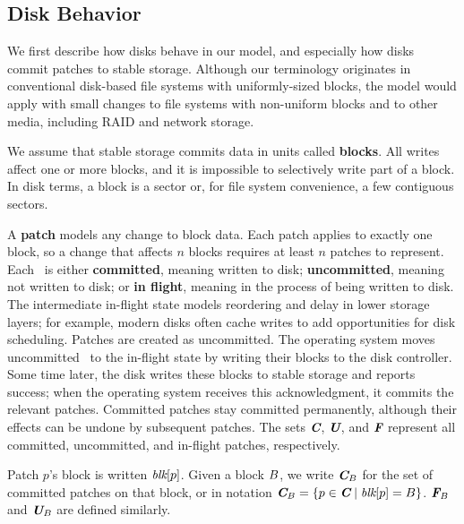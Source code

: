 \subsection{Disk Behavior}

We first describe how disks behave in our model, and
 especially how disks commit patches to stable storage.
%
Although our terminology originates in conventional disk-based file systems
 with uniformly-sized blocks, the model would apply with small changes to
 file systems with non-uniform blocks and to other media, including RAID
 and network storage.

We assume that stable storage commits data in units called
 \textbf{blocks}.
%
All writes affect one or more blocks, and it is impossible to selectively
 write part of a block.
%
In disk terms, a block is a sector or, for file system convenience,
 a few contiguous sectors.

A \textbf{patch} models any change to block data.
%
Each patch applies to exactly one block, so a change that
 affects $n$ blocks requires at least $n$ patches to represent.
%
Each \patch\ is either
 \textbf{committed}, meaning written to disk;
 \textbf{uncommitted}, meaning not written to disk;
 or \textbf{in flight}, meaning in the process of being written to disk.
%
The intermediate in-flight state models reordering and delay in
 lower storage layers; for example, modern disks often cache
 writes to add opportunities for disk scheduling.
%
Patches are created as uncommitted.
%
The operating system moves uncommitted \patches\ to the in-flight state
 by writing their blocks to the disk controller.  Some
 time later, the disk writes these blocks
 to stable storage and reports success; when the operating system receives this
 acknowledgment, it commits the relevant patches.
%
Committed patches stay committed permanently, although their effects can
 be undone by subsequent patches.
%
The sets $\PDisk$, $\PMem$, and $\PInf$ represent all committed,
 uncommitted, and in-flight patches, respectively.
%
%

Patch $p$'s block is written $\textit{blk}[{p}]$.
%
Given a block $B$, we write $\PDisk[\PB]$ for the set of committed
 patches on that block, or in notation $\PDisk[\PB] = \{p\in\PDisk\mid\PBlock{p}=\PB\}$.
%
$\PInf[\PB]$ and $\PMem[\PB]$ are defined similarly.

